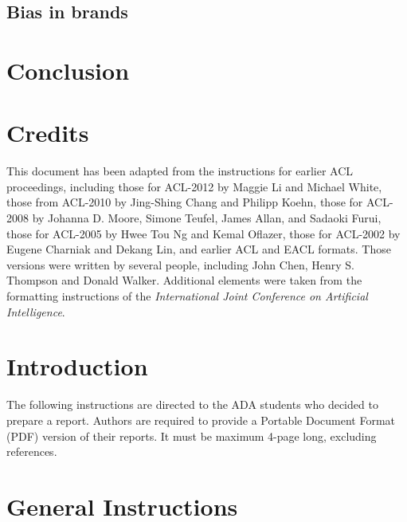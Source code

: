 \documentclass[11pt]{article}
\begin{document}
\subsection{Bias in brands}

\section{Conclusion}



\clearpage
\newpage



\section{Credits}

This document has been adapted from the instructions for earlier ACL
proceedings, including those for ACL-2012 by Maggie Li and Michael
White, those from ACL-2010 by Jing-Shing Chang and Philipp Koehn,
those for ACL-2008 by Johanna D. Moore, Simone Teufel, James Allan,
and Sadaoki Furui, those for ACL-2005 by Hwee Tou Ng and Kemal
Oflazer, those for ACL-2002 by Eugene Charniak and Dekang Lin, and
earlier ACL and EACL formats. Those versions were written by several
people, including John Chen, Henry S. Thompson and Donald
Walker. Additional elements were taken from the formatting
instructions of the {\em International Joint Conference on Artificial
  Intelligence}.

\section{Introduction}

The following instructions are directed to the ADA students who decided to prepare a report. Authors are
required to provide a Portable Document Format (PDF) version of their
reports. It must be maximum 4-page long, excluding references.

\section{General Instructions}
\end{document}
